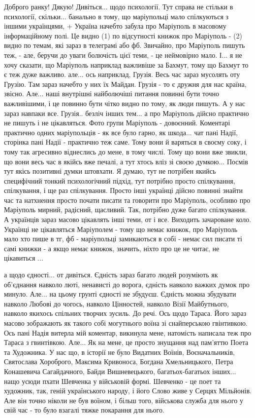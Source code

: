 Доброго ранку! Дякую! Дивіться... щодо психології. Тут справа не стільки в
психології, скільки... банально в тому, що маріупольці мало спілкуються з
іншими українцями, + Україна начебто забула про Маріуполь в масовому
інформаційному полі. Це видно (1) по відсутності книжок про Маріуполь - (2)
видно по темам, які зараз в телеграмі або фб. Звичайно, про Маріуполь пишуть
теж, - але, беручи до уваги болючість цієї теми, - це неймовірно мало. І... я
не хочу сказати, що Маріуполь наприклад важливіше за Бахмут, тому що Бахмут то
є теж дуже важливо. але... ось наприклад, Грузія. Весь час зараз мусолять оту
Грузію. Там зараз начебто у них їх Майдан. Грузія - то є дружня для нас країна,
звісно. Але... наші внутрішні найболючіші питання повинні бути точно
важливішими, і це повинно бути чітко видно по тому, як люди пишуть. А у нас
зараз навпаки все. Грузія.. безліч інших тем... а про Маріуполь дійсно
практично не пишуть і не цікавляться. Фото групи Маріуполь - довоєнний.
Коментарі практично одних маріупольців - як все було гарно, як шкода... чат
пані Надії, сторінка пані Надії - практично теж саме. Тому вони й варяться в
своєму соку, і тому так агресивно віднеслись до мене, в тому числі. Тому що
вони вже звикли, що вони весь час в якійсь вже печалі, а тут хтось вліз зі
своєю думкою... Посмів тут якісь позитивні думки штовхати. Я думаю, тут не
потрібен якийсь специфічний тонкий психологічний підхід, тут потрібно просто
спілкування, спілкування, і ще раз спілкування. Просто інші українці дійсно
повинні знайти час та натхнення просто почати писати та говорити про Маріуполь,
особливо про Маріуполь мирний, радісний, щасливий. Так, потрібно дуже багато
спілкування. А українців зараз масово цікавлять інші теми, от і все. Виходить
зачароване коло. Українці не цікавляться Маріуполем - тому що немає книжок, про
Маріуполь мало хто пише в тг, фб - маріупольці замикаються в собі - немає сил
писати ті самі книжки - а якщо немає книжок, значить, ніхто про це не читає, не
цікавиться ...

а щодо єдності... от дивіться. Єдність зараз багато людей розуміють як
об'єднання навколо люті, ненависті до ворога, єдність навколо важких думок про
минуло. Але... на цьому грунті єдності не збудуєш. Єдність можна збудувати
навколо Любові до чогось, навколо Цінностей, навколо Візії Майбутнього, навколо
якихось спільних творчих зусиль. До речі. Ось щодо Тараса. Його зараз масово
зображають як такого собі могутнього воїна зі снайперською гвінтивкою. Ось пані
Надія витерла мій коментар, викинула мене, натомість написала теж про Тараса з
гвинтівкою. Але... Як на мене, це просто знущання над пам'яттю Поета та
Художника. У нас що, в історії не було Видатних Воїнів, Воєначальників,
Святослава Хороброго, Максима Кривоноса, Богдана Хмельницького, Петра
Конашевича Сагайдачного, Байди Вишневецького, багатьох-багатьох інших... нащо
усюди пхати Шевченка у військовій формі. Шевченко - це поет та художник, так,
геній українського народу, і його Слово живе у Серцях Мільйонів. Але він точно
ніколи не був воїном, і більш того, військова служба для нього у свій час - то
було взагалі тяжке покарання для нього.

